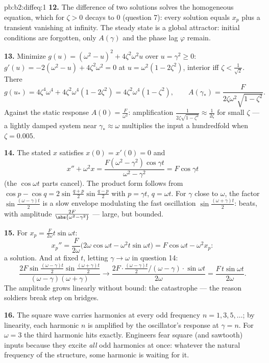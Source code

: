 \begin{solution}{pb:b2:diffeq:1}
\textbf{12.} The difference of two solutions solves the
homogeneous equation, which for $\zeta > 0$ decays to $0$
(question 7): every solution equals $x_p$ plus a transient
vanishing at infinity. The steady state is a global attractor:
initial conditions are forgotten, only $A(\gamma)$ and the
phase lag $\varphi$ remain.

\textbf{13.} Minimize $g(u) = (\omega^2 - u)^2 +
4\zeta^2\omega^2u$ over $u = \gamma^2 \geq 0$: $g'(u) =
-2(\omega^2 - u) + 4\zeta^2\omega^2 = 0$ at $u = \omega^2(1 -
2\zeta^2)$, interior iff $\zeta < \frac{1}{\sqrt2}$. There
\[
g(u_*) = 4\zeta^4\omega^4 + 4\zeta^2\omega^4(1 - 2\zeta^2)
= 4\zeta^2\omega^4(1 - \zeta^2),
\qquad
A(\gamma_*) = \frac{F}{2\zeta\omega^2\sqrt{1 - \zeta^2}} .
\]
Against the static response $A(0) = \frac{F}{\omega^2}$:
amplification $\frac{1}{2\zeta\sqrt{1-\zeta^2}} \approx
\frac{1}{2\zeta}$ for small $\zeta$ --- a lightly damped
system near $\gamma_* \approx \omega$ multiplies the input a
hundredfold when $\zeta = 0.005$.

\textbf{14.} The stated $x$ satisfies $x(0) = x'(0) = 0$ and
\[
x'' + \omega^2 x = \frac{F(\omega^2 -
\gamma^2)\cos\gamma t}{\omega^2 - \gamma^2} = F\cos\gamma t
\]
(the $\cos\omega t$ parts cancel). The product form follows
from $\cos p - \cos q = 2\sin\frac{q+p}{2}\sin\frac{q-p}2$
with $p = \gamma t$, $q = \omega t$. For $\gamma$ close to
$\omega$, the factor $\sin\frac{(\omega-\gamma)t}2$ is a slow
envelope modulating the fast oscillation
$\sin\frac{(\omega+\gamma)t}2$: beats, with amplitude
$\frac{2F}{\abs{\omega^2-\gamma^2}}$ --- large, but bounded.

\textbf{15.} For $x_p = \frac{F}{2\omega}t\sin\omega t$:
\[
x_p'' = \frac{F}{2\omega}\bigl(2\omega\cos\omega t -
\omega^2t\sin\omega t\bigr)
= F\cos\omega t - \omega^2x_p :
\]
a solution. And at fixed $t$, letting $\gamma \to \omega$ in
question 14:
\[
\frac{2F\sin\frac{(\omega-\gamma)t}2
\sin\frac{(\omega+\gamma)t}{2}}
{(\omega-\gamma)(\omega+\gamma)}
\longrightarrow
\frac{2F\cdot\frac{(\omega-\gamma)t}2\big/(\omega-\gamma)
\cdot\sin\omega t}{2\omega}
= \frac{F\,t\sin\omega t}{2\omega} .
\]
The amplitude grows linearly without bound: the 
catastrophe --- the reason soldiers break step on bridges.

\textbf{16.} The square wave carries harmonics at every odd
frequency $n = 1, 3, 5, \dots$; by linearity, each harmonic
$n$ is amplified by the oscillator's response at $\gamma = n$.
For $\omega = 3$ the third harmonic hits  exactly.
Engineers fear square (and sawtooth) inputs because they
excite \emph{all} odd harmonics at once: whatever the natural
frequency of the structure, some harmonic is waiting for it.


\end{solution}
